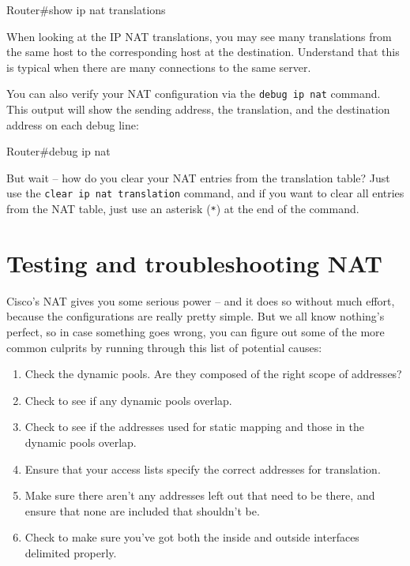 \begin{cli}
Router#show ip nat translations
\end{cli}

When looking at the IP NAT translations, you may see many translations
from the same host to the corresponding host at the destination.
Understand that this is typical when there are many connections to the
same server.

You can also verify your NAT configuration via the
\texttt{debug\ ip\ nat} command. This output will show the sending
address, the translation, and the destination address on each debug
line:

\begin{cli}
Router#debug ip nat
\end{cli}

But wait -- how do you clear your NAT entries from the translation table?
Just use the \texttt{clear\ ip\ nat\ translation} command, and if you
want to clear all entries from the NAT table, just use an asterisk
(\texttt{*}) at the end of the command.



\section{Testing and troubleshooting NAT}

Cisco's NAT gives you some serious power -- and it does so without much
effort, because the configurations are really pretty simple. But we all
know nothing's perfect, so in case something goes wrong, you can figure
out some of the more common culprits by running through this list of
potential causes:

\begin{enumerate}
\item
  Check the dynamic pools. Are they composed of the right scope of
  addresses?
\item
  Check to see if any dynamic pools overlap.
\item
  Check to see if the addresses used for static mapping and those in the
  dynamic pools overlap.
\item
  Ensure that your
  access lists specify the correct addresses for translation.
\item
  Make sure there aren't any addresses left out that need to be there,
  and ensure that none are included that shouldn't be.
\item
  Check to make sure you've got both the inside and outside interfaces
  delimited properly.
\end{enumerate}

